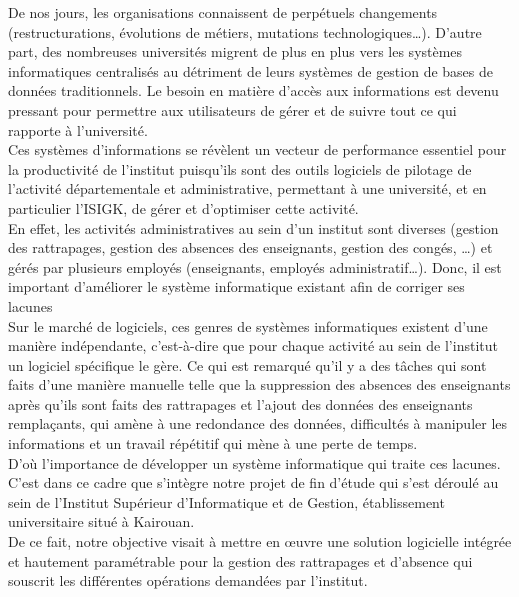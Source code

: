 \documentclass[12 pt]{report}
\begin{document}
 De nos jours, les organisations connaissent de perpétuels changements (restructurations, évolutions de métiers, mutations technologiques…). D’autre part, des nombreuses universités migrent de plus en plus vers les systèmes informatiques centralisés au détriment de leurs systèmes de gestion de bases de données traditionnels. Le besoin en matière d’accès aux informations est devenu pressant pour permettre aux utilisateurs de gérer et de suivre tout ce qui rapporte à l’université.
\\

Ces systèmes d’informations se révèlent un vecteur de performance essentiel pour la productivité de l’institut puisqu’ils sont des outils logiciels de pilotage de l’activité départementale et administrative, permettant à une université, et en particulier l’ISIGK, de gérer et d’optimiser cette activité.
\\

En effet, les activités administratives au sein d’un institut sont diverses (gestion des rattrapages, gestion des absences des enseignants, gestion des congés, …) et gérés par plusieurs employés (enseignants, employés administratif…). Donc, il est important d’améliorer le système informatique existant afin de corriger ses lacunes
\\

Sur le marché de logiciels, ces genres de systèmes informatiques existent d’une manière indépendante, c'est-à-dire que pour chaque activité au sein de l’institut un logiciel spécifique le gère. Ce qui est remarqué qu’il y a des tâches qui sont faits d’une manière manuelle telle que la suppression des absences des enseignants après qu’ils sont faits des rattrapages et l’ajout des données des enseignants remplaçants, qui amène à une redondance des données, difficultés à manipuler les informations et un travail répétitif qui mène à une perte de temps.
 \\
 
D’où l’importance de développer un système informatique qui traite ces lacunes.
\\

C’est dans ce cadre que s’intègre notre projet de fin d’étude qui s’est déroulé au sein de l’Institut Supérieur d’Informatique et de Gestion, établissement universitaire situé à Kairouan.
\\

De ce fait, notre objective visait à mettre en œuvre une solution logicielle intégrée et hautement paramétrable pour la gestion des rattrapages et d’absence qui souscrit les différentes opérations demandées par l’institut.
\\
\end{document}
